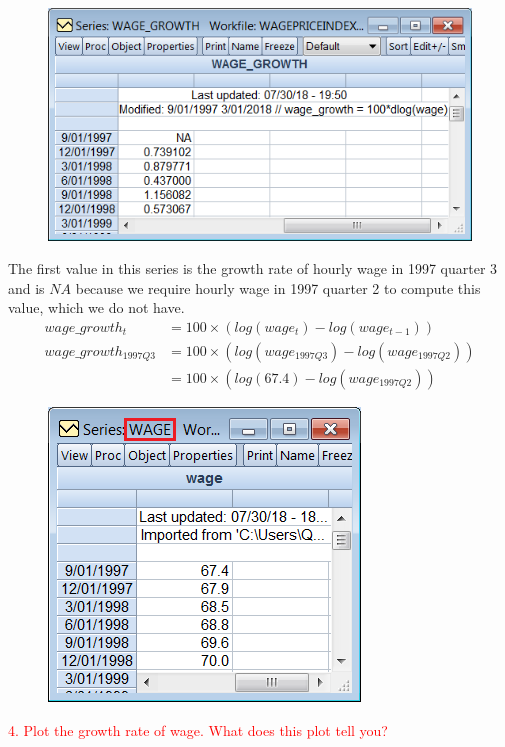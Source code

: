 \documentclass[12pt]{report}
\begin{document}
\vspace{-\baselineskip}
\begin{figure}[H]
	\centerline{\includegraphics{2018sem2_q2_9}}
\end{figure}
\vspace{-\baselineskip} \noindent The first value in this series is the growth rate of hourly wage in 1997 quarter 3 and is $NA$ because we require hourly wage in 1997 quarter 2 to compute this value, which we do not have. \begin{align*}
wage\_growth_t &= 100 \times (log(wage_t) - log(wage_{t-1})) \\
wage\_growth_{1997Q3} &= 100 \times (log(wage_{1997Q3}) - log(wage_{1997Q2})) \\
&= 100 \times (log(67.4) - log(wage_{1997Q2}))
\end{align*}
\begin{figure}[H]
	\centerline{\includegraphics{2018sem2_q2_10}}
\end{figure}

\newpage
\noindent \textcolor{red}{4. Plot the growth rate of wage. What does this plot tell you?}
\end{document}
